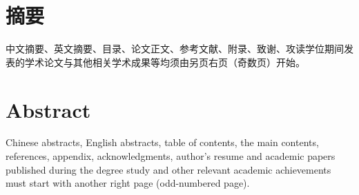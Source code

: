 \makeTitle%

\makeDeclaration%

\chapter*{摘\quad 要}
\setcounter{page}{1}

中文摘要、英文摘要、目录、论文正文、参考文献、附录、致谢、攻读学位期间发表的学术论文与其他相关学术成果等均须由另页右页（奇数页）开始。


\chapter*{Abstract}

Chinese abstracts, English abstracts, table of contents, the main contents, references, appendix, acknowledgments, author's resume and academic papers published during the degree study and other relevant academic achievements must start with another right page (odd-numbered page).


